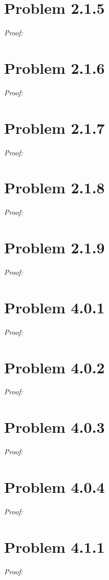\documentclass[11pt]{article}
\theoremstyle{definition}
\theoremstyle{remark}
\theoremstyle{problem}
\begin{document}
\section{Problem 2.1.5}
\textit{Proof:} 
\newpage

\section{Problem 2.1.6}
\textit{Proof:} 
\newpage

\section{Problem 2.1.7}
\textit{Proof:} 
\newpage

\section{Problem 2.1.8}
\textit{Proof:} 
\newpage

\section{Problem 2.1.9}
\textit{Proof:} 
\newpage

\section{Problem 4.0.1}
\textit{Proof:} 
\newpage

\section{Problem 4.0.2}
\textit{Proof:} 
\newpage

\section{Problem 4.0.3}
\textit{Proof:} 
\newpage

\section{Problem 4.0.4}
\textit{Proof:} 
\newpage

\section{Problem 4.1.1}
\textit{Proof:} 
\newpage
\end{document}
